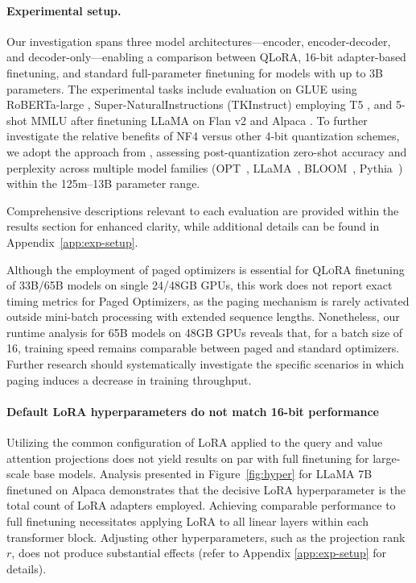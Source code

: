 \paragraph{Experimental setup.} Our investigation spans three model architectures—encoder, encoder-decoder, and decoder-only—enabling a comparison between QLoRA, 16-bit adapter-based finetuning, and standard full-parameter finetuning for models with up to 3B parameters. The experimental tasks include evaluation on GLUE \citep{wang2018glue} using RoBERTa-large \citep{liu2019roberta}, Super-NaturalInstructions (TKInstruct) \citep{wang2022super} employing T5 \citep{t5}, and 5-shot MMLU \citep{hendrycksmeasuring} after finetuning LLaMA on Flan v2 \citep{longpre2023flan} and Alpaca \citep{alpaca}. To further investigate the relative benefits of NF4 versus other 4-bit quantization schemes, we adopt the approach from \citet{dettmers2022case}, assessing post-quantization zero-shot accuracy and perplexity across multiple model families (OPT~\citep{zhang2022opt}, LLaMA~\citep{touvron2023llama}, BLOOM~\citep{scao2022bloom}, Pythia~\citep{biderman2023pythia}) within the 125m–13B parameter range.

Comprehensive descriptions relevant to each evaluation are provided within the results section for enhanced clarity, while additional details can be found in Appendix~\ref{app:exp-setup}.

Although the employment of paged optimizers is essential for \textsc{QLoRA} finetuning of 33B/65B models on single 24/48GB GPUs, this work does not report exact timing metrics for Paged Optimizers, as the paging mechanism is rarely activated outside mini-batch processing with extended sequence lengths. Nonetheless, our runtime analysis for 65B models on 48GB GPUs reveals that, for a batch size of 16, training speed remains comparable between paged and standard optimizers. Further research should systematically investigate the specific scenarios in which paging induces a decrease in training throughput.

\paragraph{Default LoRA hyperparameters do not match 16-bit performance} 

Utilizing the common configuration of LoRA applied to the query and value attention projections \citep{hu2021lora} does not yield results on par with full finetuning for large-scale base models. Analysis presented in Figure~\ref{fig:hyper} for LLaMA 7B finetuned on Alpaca demonstrates that the decisive LoRA hyperparameter is the total count of LoRA adapters employed. Achieving comparable performance to full finetuning necessitates applying LoRA to all linear layers within each transformer block. Adjusting other hyperparameters, such as the projection rank $r$, does not produce substantial effects (refer to Appendix \ref{app:exp-setup} for details).

